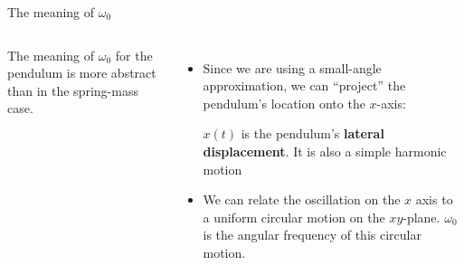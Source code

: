\documentclass[12pt,compress,aspectratio=169]{beamer}
\begin{document}
\begin{frame}{The meaning of $\omega_0$}
\begin{columns}
    The meaning of $\omega_0$ for the pendulum is more abstract than in
    the spring-mass case.
    \begin{itemize}
    \item Since we are using a small-angle approximation, we can ``project'' the
      pendulum's location onto the $x$-axis:


      \vspace{-.05in}$x(t)$ is the pendulum's \textbf{lateral displacement}.
      It is also a simple harmonic motion
      
    \item We can relate the oscillation on the $x$ axis to a uniform circular
      motion on the $xy$-plane. $\omega_0$ is the angular frequency of this
      circular motion.
    \end{itemize}
  \end{columns}
\end{frame}
\end{document}
